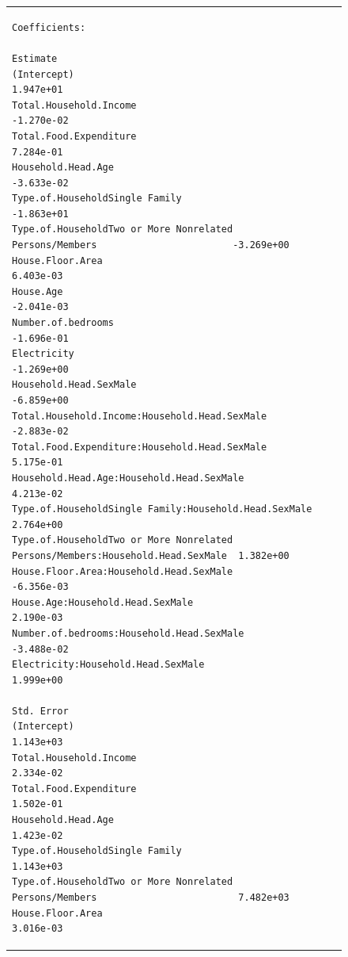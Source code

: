 \documentclass[
]{article}
\begin{document}
\begin{figure}[H]
\begin{table}[H]
\begin{tabular}[t]{lrr}
\begin{verbatim}
Coefficients:
                                                                                 Estimate
(Intercept)                                                                     1.947e+01
Total.Household.Income                                                         -1.270e-02
Total.Food.Expenditure                                                          7.284e-01
Household.Head.Age                                                             -3.633e-02
Type.of.HouseholdSingle Family                                                 -1.863e+01
Type.of.HouseholdTwo or More Nonrelated Persons/Members                        -3.269e+00
House.Floor.Area                                                                6.403e-03
House.Age                                                                      -2.041e-03
Number.of.bedrooms                                                             -1.696e-01
Electricity                                                                    -1.269e+00
Household.Head.SexMale                                                         -6.859e+00
Total.Household.Income:Household.Head.SexMale                                  -2.883e-02
Total.Food.Expenditure:Household.Head.SexMale                                   5.175e-01
Household.Head.Age:Household.Head.SexMale                                       4.213e-02
Type.of.HouseholdSingle Family:Household.Head.SexMale                           2.764e+00
Type.of.HouseholdTwo or More Nonrelated Persons/Members:Household.Head.SexMale  1.382e+00
House.Floor.Area:Household.Head.SexMale                                        -6.356e-03
House.Age:Household.Head.SexMale                                                2.190e-03
Number.of.bedrooms:Household.Head.SexMale                                      -3.488e-02
Electricity:Household.Head.SexMale                                              1.999e+00
                                                                               Std. Error
(Intercept)                                                                     1.143e+03
Total.Household.Income                                                          2.334e-02
Total.Food.Expenditure                                                          1.502e-01
Household.Head.Age                                                              1.423e-02
Type.of.HouseholdSingle Family                                                  1.143e+03
Type.of.HouseholdTwo or More Nonrelated Persons/Members                         7.482e+03
House.Floor.Area                                                                3.016e-03

\end{verbatim}
\end{tabular}
\end{table}
\end{figure}
\end{document}
